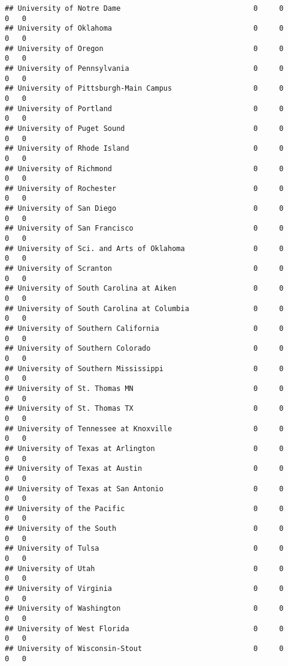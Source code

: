 \documentclass[
]{article}
\begin{document}
\begin{verbatim}
## University of Notre Dame                               0     0        0   0
## University of Oklahoma                                 0     0        0   0
## University of Oregon                                   0     0        0   0
## University of Pennsylvania                             0     0        0   0
## University of Pittsburgh-Main Campus                   0     0        0   0
## University of Portland                                 0     0        0   0
## University of Puget Sound                              0     0        0   0
## University of Rhode Island                             0     0        0   0
## University of Richmond                                 0     0        0   0
## University of Rochester                                0     0        0   0
## University of San Diego                                0     0        0   0
## University of San Francisco                            0     0        0   0
## University of Sci. and Arts of Oklahoma                0     0        0   0
## University of Scranton                                 0     0        0   0
## University of South Carolina at Aiken                  0     0        0   0
## University of South Carolina at Columbia               0     0        0   0
## University of Southern California                      0     0        0   0
## University of Southern Colorado                        0     0        0   0
## University of Southern Mississippi                     0     0        0   0
## University of St. Thomas MN                            0     0        0   0
## University of St. Thomas TX                            0     0        0   0
## University of Tennessee at Knoxville                   0     0        0   0
## University of Texas at Arlington                       0     0        0   0
## University of Texas at Austin                          0     0        0   0
## University of Texas at San Antonio                     0     0        0   0
## University of the Pacific                              0     0        0   0
## University of the South                                0     0        0   0
## University of Tulsa                                    0     0        0   0
## University of Utah                                     0     0        0   0
## University of Virginia                                 0     0        0   0
## University of Washington                               0     0        0   0
## University of West Florida                             0     0        0   0
## University of Wisconsin-Stout                          0     0        0   0

\end{verbatim}
\end{document}
